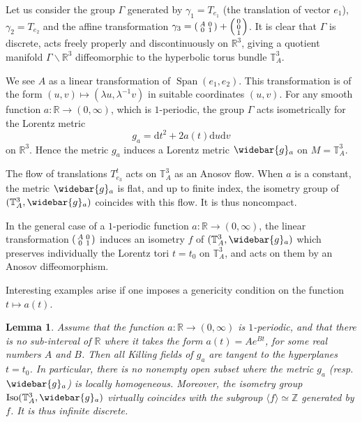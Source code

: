 \documentclass[11pt]{article}
\newtheorem{lemm}[theo]{Lemma}
\theoremstyle{definition}
\numberwithin{equation}{section}
\numberwithin{figure}{section}
\numberwithin{table}{section}
\DeclareMathOperator{\Iso}{Iso}
\DeclareMathOperator{\Span}{Span}
\newcommand*\RR{\mathbb{R}}
\newcommand*\ZZ{\mathbb{Z}}
\let\oldbar\bar
\renewcommand*{\bar}[1]{\mathchoice{\widebar{#1}}{\widebar{#1}}{\oldbar{#1}}{\oldbar{#1}}}
\renewcommand*{\overline}{\bar}
\newenvironment{smallpmatrix}{\left(\begin{smallmatrix}}{\end{smallmatrix}\right)}
\newcommand*{\dd}{\mathrm{d}}
\newcommand*{\dt}{\dd t}
\newcommand*{\du}{\dd u}
\newcommand*{\dv}{\dd v}
\begin{document}
Let us consider the group $\Gamma$ generated by $\gamma_1=T_{e_1}$ (the translation of vector $e_1$), $\gamma_2=T_{e_2}$ and the affine transformation $\gamma_3=
\begin{smallpmatrix} A & 0\\ 0 & 1
\end{smallpmatrix} +
\begin{smallpmatrix} 0\\0\\ 1
\end{smallpmatrix}$.
It is clear that $\Gamma$ is discrete, acts freely properly and discontinuously on $\RR^3$, giving a quotient manifold $\Gamma \backslash \RR^3$ diffeomorphic to the hyperbolic torus bundle ${\mathbb T}_A^3$.


We see $A$ as a linear transformation of $\Span(e_1,e_2)$. This transformation is of the form $(u,v) \mapsto (\lambda u, \lambda^{-1}v)$ in suitable coordinates $(u,v)$. For any smooth function $a: \RR \to (0,\infty)$, which is $1$-periodic, the group $\Gamma$ acts isometrically for the Lorentz metric
\[
g_a=\dt^2+2a(t)\du\dv
\]
on $\RR^3$. Hence the metric $g_a$ induces a Lorentz metric $\overline{g}_a$ on $M={\mathbb T}_A^3$.

The flow of translations $T_{e_3}^t$ acts on ${\mathbb T}_A^3$ as an Anosov flow. When $a$ is a constant, the metric $\overline{g}_a$ is flat, and up to finite index, the isometry group of $({\mathbb T}_A^3,\overline{g}_a)$ coincides with this flow. It is thus noncompact.

In the general case of a $1$-periodic function $a: \RR \to (0,\infty)$, the linear transformation $
\begin{smallpmatrix} A & 0\\ 0 & 1
\end{smallpmatrix}$ induces an isometry $f$ of
$({\mathbb T}_A^3,\overline{g}_a)$ which preserves individually the Lorentz tori $t=t_0$ on ${\mathbb T}_A^3$, and acts on them by an Anosov diffeomorphism.

Interesting examples arise if one imposes a genericity condition on the function $t \mapsto a(t)$.


\begin{lemm}\label{lem.calcul.killing}
Assume that the function $a: \RR \to (0,\infty)$ is $1$-periodic, and that there is no sub-interval of $\RR$ where it takes the form $a(t)=Ae^{Bt}$, for some real numbers $A$ and $B$. Then all Killing fields of $g_a$ are tangent to the hyperplanes $t=t_0$. In particular, there is no nonempty open subset where the metric $g_a$ (resp. $\overline{g}_a$) is locally homogeneous. Moreover, the isometry group $\Iso({\mathbb T}_A^3,\overline{g}_a)$ virtually coincides with the subgroup $\langle f \rangle \simeq \ZZ$ generated by $f$. It is thus infinite discrete.
\end{lemm}
\end{document}
